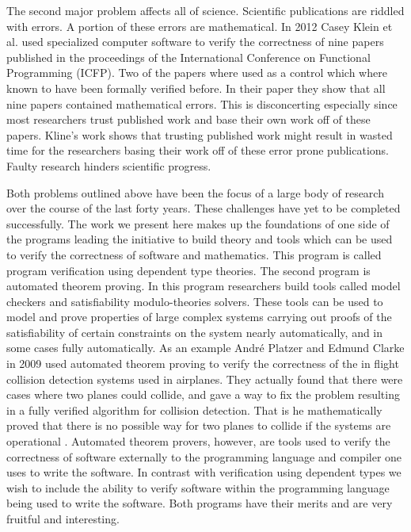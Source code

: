 \documentclass[phd,dedicationpage,ackpage,epigraphpage,figures]{uithesis}
\begin{document}
The second major problem affects all of science.  Scientific
publications are riddled with errors.  A portion of these errors are
mathematical.  In 2012 Casey Klein et al. used specialized computer
software to verify the correctness of nine papers published in the
proceedings of the International Conference on Functional Programming
(ICFP).  Two of the papers where used as a control which where known
to have been formally verified before.  In their paper
\cite{Klein:2012} they show that all nine papers contained
mathematical errors.  This is disconcerting especially since most
researchers trust published work and base their own work off of these
papers.  Kline's work shows that trusting published work might result
in wasted time for the researchers basing their work off of these
error prone publications.  Faulty research hinders scientific
progress.

Both problems outlined above have been the focus of a large body of
research over the course of the last forty years.  These challenges
have yet to be completed successfully.  The work we present here makes
up the foundations of one side of the programs leading the initiative
to build theory and tools which can be used to verify the correctness
of software and mathematics.  This program is called program
verification using dependent type theories.  The second program is
automated theorem proving.  In this program researchers build tools
called model checkers and satisfiability modulo-theories solvers.
These tools can be used to model and prove properties of large complex
systems carrying out proofs of the satisfiability of certain
constraints on the system nearly automatically, and in some cases
fully automatically.  As an example Andr\'{e} Platzer and Edmund
Clarke in 2009 used automated theorem proving to verify the
correctness of the in flight collision detection systems used in
airplanes.  They actually found that there were cases where two planes
could collide, and gave a way to fix the problem resulting in a fully
verified algorithm for collision detection.  That is he mathematically
proved that there is no possible way for two planes to collide if the
systems are operational \cite{DBLP:conf/fm/PlatzerC09}.  Automated
theorem provers, however, are tools used to verify the correctness of
software externally to the programming language and compiler one uses
to write the software.  In contrast with verification using dependent
types we wish to include the ability to verify software within the
programming language being used to write the software. Both programs
have their merits and are very fruitful and interesting.
\end{document}
